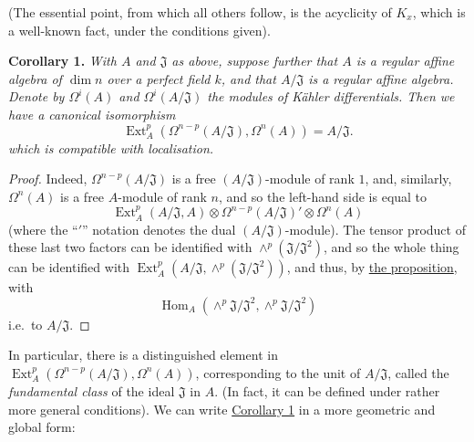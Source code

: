 \documentclass{article}
\newenvironment{itenv}[1]
  {\phantomsection\par\smallskip\noindent\textbf{#1.}\itshape}
  {\par\smallskip}
\theoremstyle{definition}
\theoremstyle{definition}
\theoremstyle{definition}
\theoremstyle{definition}
\theoremstyle{remark}
\begin{document}
(The essential point, from which all others follow, is the acyclicity of \(K_x\), which is a well-known fact, under the conditions given).

\leavevmode{}%
\begin{itenv}{Corollary 1}
With \(A\) and \({\mathfrak{J}}\) as above, suppose further that \(A\) is a regular affine algebra of \(\dim n\) over a perfect field \(k\), and that \(A/{\mathfrak{J}}\) is a regular affine algebra.
Denote by \(\Omega^i(A)\) and \(\Omega^i(A/{\mathfrak{J}})\) the modules of Kähler differentials.
Then we have a canonical isomorphism
\[
  \operatorname{Ext}_A^p(\Omega^{n-p}(A/{\mathfrak{J}}),\Omega^n(A)) = A/{\mathfrak{J}}.
\tag{3.5}
\]
which is compatible with localisation.

\end{itenv}

\begin{proof}
Indeed, \(\Omega^{n-p}(A/{\mathfrak{J}})\) is a free \((A/{\mathfrak{J}})\)-module of rank \(1\), and, similarly, \(\Omega^n(A)\) is a free \(A\)-module of rank \(n\), and so the left-hand side is equal to
\[
  \operatorname{Ext}_A^p(A/{\mathfrak{J}},A) \otimes \Omega^{n-p}(A/{\mathfrak{J}})' \otimes \Omega^n(A)
\]
(where the ``\('\)'' notation denotes the dual \((A/{\mathfrak{J}})\)-module).
The tensor product of these last two factors can be identified with \(\wedge^p({\mathfrak{J}}/{\mathfrak{J}}^2)\), and so the whole thing can be identified with \(\operatorname{Ext}_A^p(A/{\mathfrak{J}},\wedge^p({\mathfrak{J}}/{\mathfrak{J}}^2))\), and thus, by \protect\hyperlink{fga-1-proposition-4}{the proposition}, with
\[
  \operatorname{Hom}_A(\wedge^p {\mathfrak{J}}/{\mathfrak{J}}^2,\wedge^p {\mathfrak{J}}/{\mathfrak{J}}^2)
\]
i.e.~to \(A/{\mathfrak{J}}\).
\end{proof}

In particular, there is a distinguished element in \(\operatorname{Ext}_A^p(\Omega^{n-p}(A/{\mathfrak{J}}),\Omega^n(A))\), corresponding to the unit of \(A/{\mathfrak{J}}\), called the \emph{fundamental class} of the ideal \({\mathfrak{J}}\) in \(A\).
(In fact, it can be defined under rather more general conditions).
We can write \protect\hyperlink{fga-1-proposition-4-corollary-1}{Corollary 1} in a more geometric and global form:
\end{document}
